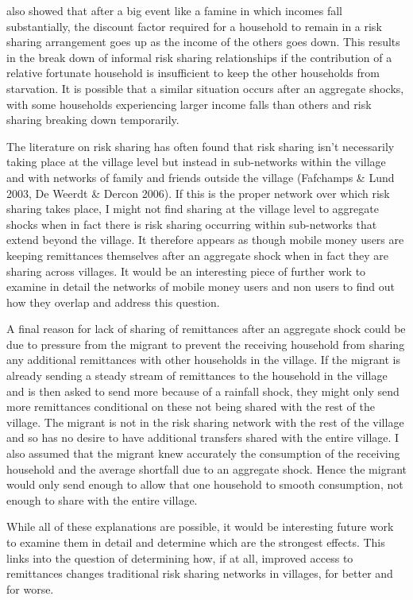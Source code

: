\cite{coate1993} also showed that after a big event like a famine in which incomes fall substantially, the discount factor required for a household to remain in a risk sharing arrangement goes up as the income of the others goes down. This results in the break down of informal risk sharing relationships if the contribution of a relative fortunate household is insufficient to keep the other households from starvation. It is possible that a similar situation occurs after an aggregate shocks, with some households experiencing larger income falls than others and risk sharing breaking down temporarily.  

The literature on risk sharing has often found that risk sharing isn't necessarily taking place at the village level but instead in sub-networks within the village and with networks of family and friends outside the village (Fafchamps \& Lund 2003, De Weerdt \& Dercon 2006). If this is the proper network over which risk sharing takes place, I might not find sharing at the village level to aggregate shocks when in fact there is risk sharing occurring within sub-networks that extend beyond the village. It therefore appears as though mobile money users are keeping remittances themselves after an aggregate shock when in fact they are sharing across villages. It would be an interesting piece of further work to examine in detail the networks of mobile money users and non users to find out how they overlap and address this question. 

A final reason for lack of sharing of remittances after an aggregate shock could be due to pressure from the migrant to prevent the receiving household from sharing any additional remittances with other households in the village. If the migrant is already sending a steady stream of remittances to the household in the village and is then asked to send more because of a rainfall shock, they might only send more remittances conditional on these not being shared with the rest of the village. The migrant is not in the risk sharing network with the rest of the village and so has no desire to have additional transfers shared with the entire village. I also assumed that the migrant knew accurately the consumption of the receiving household and the average shortfall due to an aggregate shock. Hence the migrant would only send enough to allow that one household to smooth consumption, not enough to share with the entire village.  

While all of these explanations are possible, it would be interesting future work to examine them in detail and determine which are the strongest effects. This links into the question of determining how, if at all, improved access to remittances changes traditional risk sharing networks in villages, for better and for worse. 



